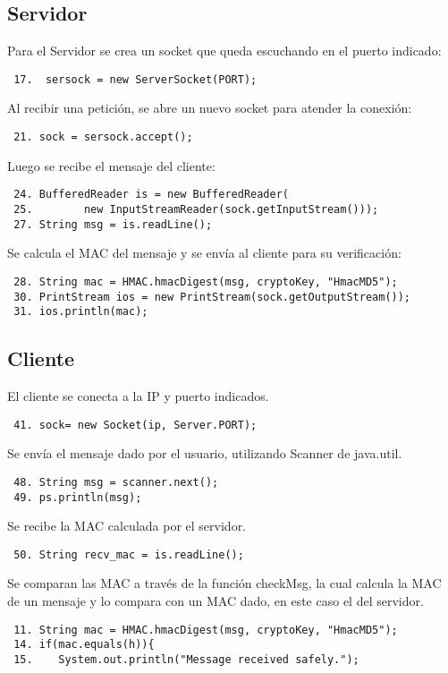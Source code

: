 \documentclass[letter, 10pt]{article}
\begin{document}
\subsection{Servidor}
Para el Servidor se crea un socket que queda escuchando en el puerto indicado:
\begin{verbatim}
 17.  sersock = new ServerSocket(PORT);
\end{verbatim}
Al recibir una petición, se abre un nuevo socket para atender la conexión:
\begin{verbatim}
 21. sock = sersock.accept();
\end{verbatim}
Luego se recibe el mensaje del cliente:
\begin{verbatim}
 24. BufferedReader is = new BufferedReader(
 25.        new InputStreamReader(sock.getInputStream()));
 27. String msg = is.readLine();
\end{verbatim}
Se calcula el MAC del mensaje y se envía al cliente para su verificación:
\begin{verbatim}
 28. String mac = HMAC.hmacDigest(msg, cryptoKey, "HmacMD5"); 
 30. PrintStream ios = new PrintStream(sock.getOutputStream());
 31. ios.println(mac);
\end{verbatim}

\subsection{Cliente}
El cliente se conecta a la IP y puerto indicados.
\begin{verbatim}
 41. sock= new Socket(ip, Server.PORT);
\end{verbatim}
Se envía el mensaje dado por el usuario, utilizando Scanner de java.util.
\begin{verbatim}
 48. String msg = scanner.next(); 
 49. ps.println(msg); 
\end{verbatim}
Se recibe la MAC calculada por el servidor.
\begin{verbatim}
 50. String recv_mac = is.readLine();  
\end{verbatim}
Se comparan las MAC a través de la función checkMsg, la cual calcula la MAC de un mensaje
y lo compara con un MAC dado, en este caso el del servidor.
\begin{verbatim}
 11. String mac = HMAC.hmacDigest(msg, cryptoKey, "HmacMD5");
 14. if(mac.equals(h)){                                 
 15.    System.out.println("Message received safely.");
\end{verbatim}

\newpage
\end{document}

